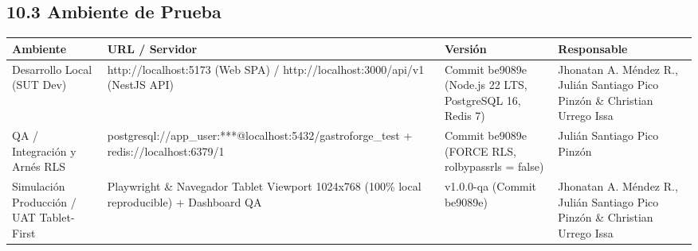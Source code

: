 \documentclass[10pt,a4paper]{article}
\newcounter{none}
\begin{document}
\endgroup\medskip


\subsection{10.3 Ambiente de Prueba}\label{103-ambiente-de-prueba}

\begingroup\singlespacing\footnotesize\setlength{\parskip}{0pt}

{\def\LTcaptype{none} %
\begin{longtable}[]{@{}
  >{\raggedright\arraybackslash}p{}
  >{\raggedright\arraybackslash}p{}
  >{\raggedright\arraybackslash}p{}
  >{\raggedright\arraybackslash}p{}@{}}
\toprule\noalign{}
\begin{minipage}[b]{\linewidth}\raggedright
Ambiente
\end{minipage} & \begin{minipage}[b]{\linewidth}\raggedright
URL / Servidor
\end{minipage} & \begin{minipage}[b]{\linewidth}\raggedright
Versión
\end{minipage} & \begin{minipage}[b]{\linewidth}\raggedright
Responsable
\end{minipage} \\
\midrule\noalign{}
\endhead
\bottomrule\noalign{}
\endlastfoot
Desarrollo Local (SUT Dev) & http://localhost:5173 (Web SPA) / http://localhost:3000/api/v1 (NestJS API) & Commit be9089e (Node.js 22 LTS, PostgreSQL 16, Redis 7) & Jhonatan A. Méndez R., Julián Santiago Pico Pinzón \& Christian Urrego Issa \\
QA / Integración y Arnés RLS & postgresql://app\_user:***@localhost:5432/gastroforge\_test + redis://localhost:6379/1 & Commit be9089e (FORCE RLS, rolbypassrls = false) & Julián Santiago Pico Pinzón \\
Simulación Producción / UAT Tablet-First & Playwright \& Navegador Tablet Viewport 1024x768 (100\% local reproducible) + Dashboard QA & v1.0.0-qa (Commit be9089e) & Jhonatan A. Méndez R., Julián Santiago Pico Pinzón \& Christian Urrego Issa \\
\end{longtable}
}

\endgroup\medskip
\end{document}
